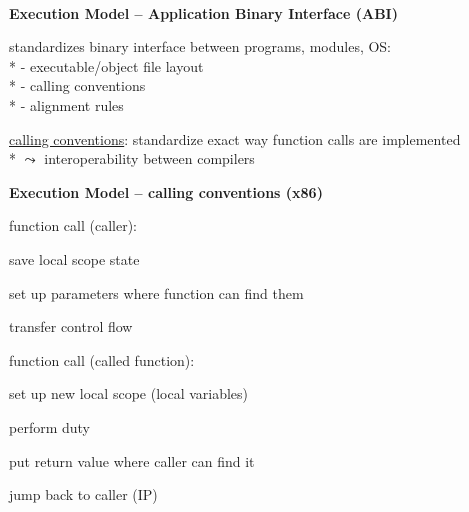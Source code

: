 \ \\
\textbf{Execution Model -- Application Binary Interface (ABI)}
\begin{items}
  \item standardizes binary interface between programs, modules, OS: \\*
    - executable/object file layout \\*
    - calling conventions \\*
    - alignment rules
  \item \underline{calling conventions}: standardize exact way function calls are implemented \\*
    \( \leadsto \) interoperability between compilers
\end{items}

\textbf{Execution Model -- calling conventions (x86)}
\begin{items}
  \item function call (caller):
  \begin{enumeration}
    \item save local scope state 
    \item set up parameters where function can find them
    \item transfer control flow
  \end{enumeration}
  \item function call (called function):
  \begin{enumeration}
    \item set up new local scope (local variables)
    \item perform duty
    \item put return value where caller can find it
    \item jump back to caller (IP)
  \end{enumeration}
\end{items}